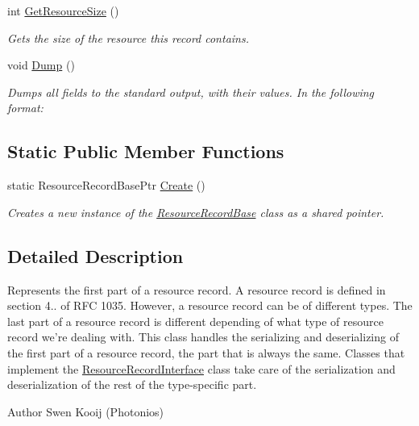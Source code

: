 \begin{DoxyCompactItemize}
int \hyperlink{class_senergy_1_1_dns_1_1_resource_record_base_ad077545843d4565a39a4d6e1cffb8859}{Get\-Resource\-Size} ()
\begin{DoxyCompactList}\small\item\em Gets the size of the resource this record contains. \end{DoxyCompactList}\item 
void \hyperlink{class_senergy_1_1_dns_1_1_resource_record_base_ae4c4b80c9325c026eed376e28cd6ddc3}{Dump} ()
\begin{DoxyCompactList}\small\item\em Dumps all fields to the standard output, with their values. In the following format\-: \end{DoxyCompactList}\end{DoxyCompactItemize}
\subsection*{Static Public Member Functions}
\begin{DoxyCompactItemize}
\item 
static Resource\-Record\-Base\-Ptr \hyperlink{class_senergy_1_1_dns_1_1_resource_record_base_a21ea1d5b7a354e2025c01248c019f6a1}{Create} ()
\begin{DoxyCompactList}\small\item\em Creates a new instance of the \hyperlink{class_senergy_1_1_dns_1_1_resource_record_base}{Resource\-Record\-Base} class as a shared pointer. \end{DoxyCompactList}\end{DoxyCompactItemize}


\subsection{Detailed Description}
Represents the first part of a resource record. A resource record is defined in section 4.. of R\-F\-C 1035. However, a resource record can be of different types. The last part of a resource record is different depending of what type of resource record we're dealing with. This class handles the serializing and deserializing of the first part of a resource record, the part that is always the same. Classes that implement the \hyperlink{class_senergy_1_1_dns_1_1_resource_record_interface}{Resource\-Record\-Interface} class take care of the serialization and deserialization of the rest of the type-\/specific part. 

\begin{DoxyAuthor}{Author}
Swen Kooij (Photonios) 
\end{DoxyAuthor}


